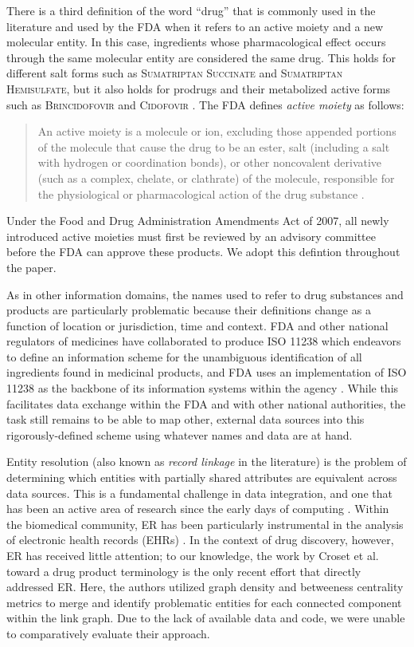\documentclass{bmcart}
\begin{document}
There is a third definition of the word ``drug'' that is commonly used in
the literature and used by the FDA when it refers to an active moiety
and a new molecular entity. In this case, ingredients whose
pharmacological effect occurs through the same molecular entity are
considered the same drug. This holds for different salt forms such as
\textsc{Sumatriptan Succinate} and \textsc{Sumatriptan Hemisulfate},
but it also holds for prodrugs and their metabolized active forms such
as \textsc{Brincidofovir} and \textsc{Cidofovir} \cite{NME}. The FDA
defines \emph{active moiety} as follows:
\begin{quote}An active moiety is a molecule or
ion, excluding those appended portions of the molecule that cause the
drug to be an ester, salt (including a salt with hydrogen or
coordination bonds), or other noncovalent derivative (such as a
complex, chelate, or clathrate) of the molecule, responsible for the
physiological or pharmacological action of the drug
substance \cite{CFR2012}.
\end{quote}
Under the Food and Drug Administration
Amendments Act of 2007, all newly introduced active moieties must
first be reviewed by an advisory committee before the FDA can approve
these products. We adopt this defintion throughout the paper.

As in other information domains, the names used to refer to drug
substances and products are particularly problematic because their
definitions change as a function of location or jurisdiction, time and
context. FDA and other national regulators of medicines have
collaborated to produce ISO 11238 \cite{ISO11238} which endeavors to
define an information scheme for the unambiguous identification of all
ingredients found in medicinal products, and FDA uses an
implementation of ISO 11238 as the backbone of its information systems
within the agency \cite{GSRS}. While this facilitates data exchange within
the FDA and with other national authorities, the task still remains to
be able to map other, external data sources into this
rigorously-defined scheme using whatever names and data are at hand. 

Entity resolution (also known as \emph{record linkage} in the
literature) is the problem of determining which entities with
partially shared attributes are equivalent across data sources. This
is a fundamental challenge in data integration, and one that has been
an active area of research since the early days of computing
\cite{Newcombe1959}. Within the biomedical community, ER has been
particularly instrumental in the analysis of electronic health records
(EHRs) \cite{Karr2019}. In the context of drug discovery, however, ER
has received little attention; to our knowledge, the work by Croset
et al. toward a drug product terminology \cite{Croset2015} is the only
recent effort that directly addressed ER. Here, the authors utilized
graph density and betweeness centrality metrics to merge and identify 
problematic entities for each connected component within the link
graph. Due to the lack of available data and code, we were unable to
comparatively evaluate their approach.
\end{document}

